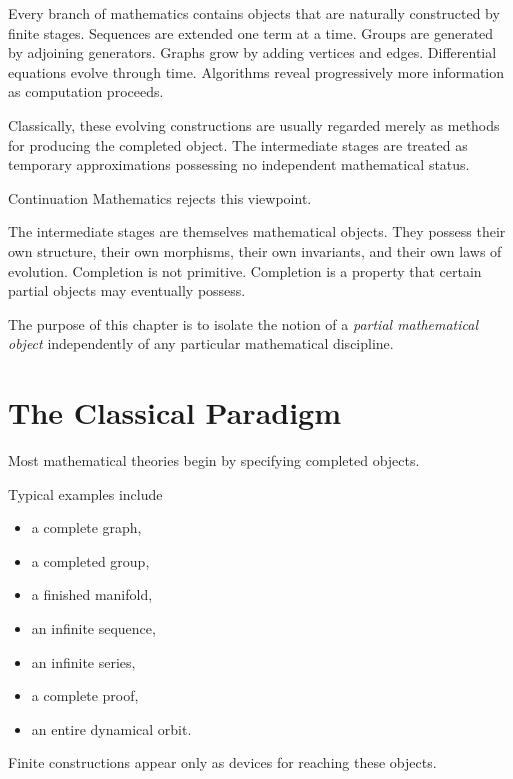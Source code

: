 \documentclass[13pt,openany]{book}
\theoremstyle{plain}
\theoremstyle{definition}
\begin{document}
\vspace{1em}

Every branch of mathematics contains objects that are naturally
constructed by finite stages. Sequences are extended one term at a time.
Groups are generated by adjoining generators. Graphs grow by adding
vertices and edges. Differential equations evolve through time.
Algorithms reveal progressively more information as computation proceeds.

Classically, these evolving constructions are usually regarded merely as
methods for producing the completed object. The intermediate stages are
treated as temporary approximations possessing no independent
mathematical status.

Continuation Mathematics rejects this viewpoint.

The intermediate stages are themselves mathematical objects. They possess
their own structure, their own morphisms, their own invariants, and their
own laws of evolution. Completion is not primitive. Completion is a
property that certain partial objects may eventually possess.

The purpose of this chapter is to isolate the notion of a
\emph{partial mathematical object} independently of any particular
mathematical discipline.

\section{The Classical Paradigm}

Most mathematical theories begin by specifying completed objects.

Typical examples include

\begin{itemize}
\item a complete graph,
\item a completed group,
\item a finished manifold,
\item an infinite sequence,
\item an infinite series,
\item a complete proof,
\item an entire dynamical orbit.
\end{itemize}

Finite constructions appear only as devices for reaching these objects.
\end{document}
